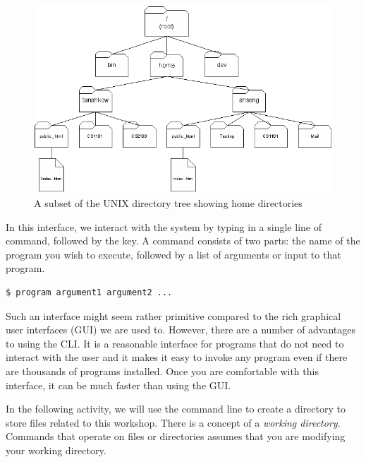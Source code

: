 \begin{frame}
\begin{figure}
\begin{center}
\includegraphics[scale=0.4]{file_home}
\end{center}
\caption{A subset of the UNIX directory tree showing home directories}
\label{fig:dir}
\end{figure}
\end{frame}

In this interface, we interact with the system by typing in a single line of
command, followed by the  key.  A command consists of two parts: the
name of the program you wish to execute, followed by a list of arguments or
input to that program.  

\begin{frame}[fragile]
\begin{Large}
\begin{verbatim}
$ program argument1 argument2 ...
\end{verbatim}
\end{Large}
\end{frame}

Such an interface might seem rather primitive compared to the rich graphical
user interfaces (GUI) we are used to.  However, there are a number of advantages
to using the CLI. It is a reasonable interface for programs that do not need to
interact with the user and it makes it easy to invoke any program even if there
are thousands of programs installed. Once you are comfortable with this
interface, it can be much faster than using the GUI.  



In the following activity, we will use the command line to create a directory to
store files related to this workshop.  There is a concept of a \emph{working
directory}. Commands that operate on files or directories assumes that you are
modifying your working directory.  

